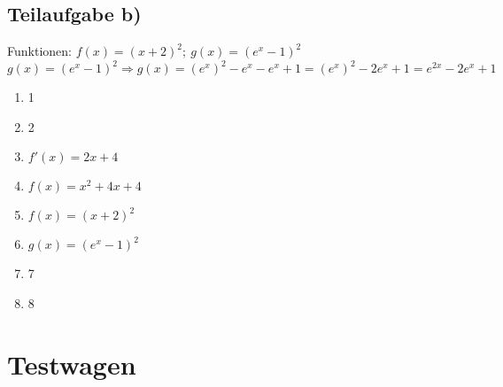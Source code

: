 \documentclass[11pt, a4paper]{report}
\begin{document}
	\section{Teilaufgabe b)}
	Funktionen: $f(x) = (x + 2)^2;\ g(x) = (e^x - 1)^2$ \\
	$g(x) = (e^x - 1)^2 \Rightarrow g(x) = (e^x)^2  - e^x - e^x + 1 = (e^x)^2 - 2e^x + 1 = e^{2x} - 2e^x + 1$
	\begin{enumerate}
		\item 1
		\item 2
		\item $f'(x) = 2x + 4$
		\item $f(x) = x^2 + 4x + 4$
		\item $f(x) = (x + 2)^2$
		\item $g(x) = (e^x - 1)^2$
		\item 7
		\item 8
	\end{enumerate}
	\chapter{Testwagen}
	
\end{document}
